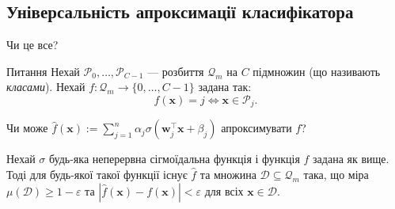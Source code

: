 \documentclass{zkdl-presentation-template}
\begin{document}
    \subsection{Універсальність апроксимації класифікатора}
    \begin{frame}{Чи це все?}
        \begin{alertblock}{Питання}
            Нехай $\mathcal{P}_0,\dots,\mathcal{P}_{C-1}$ ---
            розбиття $\mathcal{Q}_m$ на $C$ підмножин (що називають \textit{класами}). Нехай
            $f: \mathcal{Q}_m \to \{0,\dots,C-1\}$ задана так:
            \begin{equation*}
                f(\boldsymbol{x}) = j \iff \boldsymbol{x} \in \mathcal{P}_j.
            \end{equation*}

            Чи може $\hat{f}(\boldsymbol{x}) := \sum_{j=1}^n
            \alpha_j\sigma(\boldsymbol{w}_j^{\top}\boldsymbol{x} + \beta_j)$ апроксимувати 
            $f$?
        \end{alertblock}

        \begin{theorem}
            Нехай $\sigma$ будь-яка неперервна сігмоїдальна функція і функція
            $f$ задана як вище. Тоді для будь-якої такої функції існує $\hat{f}$
            та множина $\mathcal{D} \subseteq \mathcal{Q}_m$ така, що міра
            $\mu(\mathcal{D}) \geq 1-\varepsilon$ та $|\hat{f}(\boldsymbol{x}) -
            f(\boldsymbol{x})| < \varepsilon$ для всіх $\boldsymbol{x} \in \mathcal{D}$.
        \end{theorem}
    \end{frame}
\end{document}
